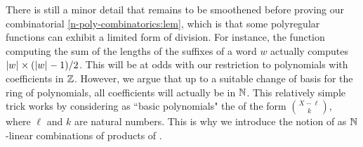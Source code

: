 \AP There is still a minor detail that remains to be smoothened before proving
our combinatorial \cref{n-poly-combinatorics:lem}, which is that some
polyregular functions can exhibit a limited form of division. For instance, the
function computing the sum of the lengths of the suffixes of a word $w$
actually computes $\card{w} \times (\card{w} - 1) / 2$. This will be at odds
with our restriction to polynomials with coefficients in $\mathbb{Z}$. However, we
argue that up to a suitable change of basis for the ring of polynomials, all
coefficients will actually be in $\mathbb{N}$. This relatively simple trick works by
considering as ``basic polynomials" the  of the
form $\binom{X - \ell}{k}$, where $\ell$ and $k$ are natural numbers. This is
why we introduce the notion of  as
$\mathbb{N}$-linear combinations of products of .

